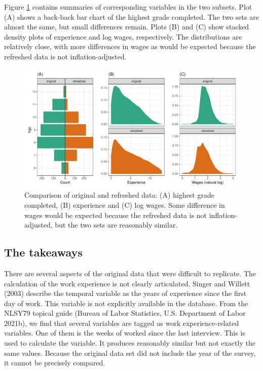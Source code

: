 \documentclass{article}
\begin{document}
Figure \ref{fig:compare-subsets} contains summaries of corresponding variables in the two subsets. Plot (A) shows a back-back bar chart of the highest grade completed. The two sets are almost the same, but small differences remain. Plots (B) and (C) show stacked density plots of experience and log wages, respectively. The distributions are relatively close, with more differences in wages as would be expected because the refreshed data is not inflation-adjusted.

\begin{figure}

{\centering \includegraphics[width=1\linewidth]{figures/compare-subsets-1} 

}

\caption{Comparison of original and refreshed data: (A) highest grade completed, (B) experience and (C) log wages. Some difference in wages would be expected because the refreshed data is not inflation-adjusted, but the two sets are reasonably similar.}\label{fig:compare-subsets}
\end{figure}

\hypertarget{takeaways}{%
\subsection{The takeaways}\label{takeaways}}

There are several aspects of the original data that were difficult to replicate. The calculation of the work experience is not clearly articulated. Singer and Willett (2003) describe the temporal variable as the years of experience since the first day of work. This variable is not explicitly available in the database. From the NLSY79 topical guide (Bureau of Labor Statistics, U.S. Department of Labor 2021b), we find that several variables are tagged as work experience-related variables. One of them is the weeks of worked since the last interview. This is used to calculate the variable. It produces reasonably similar but not exactly the same values. Because the original data set did not include the year of the survey, it cannot be precisely compared.
\end{document}
